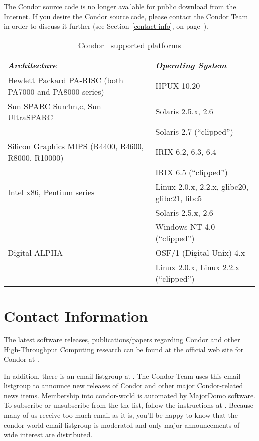 The Condor source code is no longer available for public download from the Internet.  If you 
desire the Condor source code, please contact the Condor Team in order to discuss it further 
(see Section~\ref{contact-info}, on page~\pageref{contact-info}).

\begin{center}
\begin{table}
\begin{tabular}{|ll|} \hline
\emph{Architecture} & \emph{Operating System} \\ \hline \hline
Hewlett Packard PA-RISC (both PA7000 and PA8000 series) & HPUX 10.20 \\ \hline
Sun SPARC Sun4{m,c}, Sun UltraSPARC & Solaris 2.5.x, 2.6 \\
 & Solaris 2.7 (``clipped'') \\ \hline
Silicon Graphics MIPS (R4400, R4600, R8000, R10000) & IRIX 6.2, 6.3, 6.4 \\ 
 & IRIX 6.5 (``clipped'') \\ \hline
Intel x86, Pentium series & Linux 2.0.x, 2.2.x, glibc20, glibc21, libc5 \\
 & Solaris 2.5.x, 2.6 \\ 
 & Windows NT 4.0 (``clipped'') \\ \hline
Digital ALPHA & OSF/1 (Digital Unix) 4.x \\
 & Linux 2.0.x, Linux 2.2.x (``clipped'') \\ \hline
\end{tabular}
\caption{\label{supported-platforms}Condor \VersionNotice\ supported platforms}
\end{table}
\end{center}



\section{\label{contact-info}Contact Information}

The latest software releases, publications/papers regarding Condor and other 
High-Throughput Computing
research can be found at the official web site for Condor at  
.

In addition, there is an email listgroup at .  The Condor Team 
uses this email listgroup to announce new releases of Condor and other major Condor-related 
news items.  Membership into condor-world is automated by MajorDomo software.  To 
subscribe or unsubscribe from the the list, follow the instructions at  
.  Because many of us receive 
too much email as it is, you'll be happy to know that the condor-world email listgroup is 
moderated and only major announcements of wide interest are distributed.

